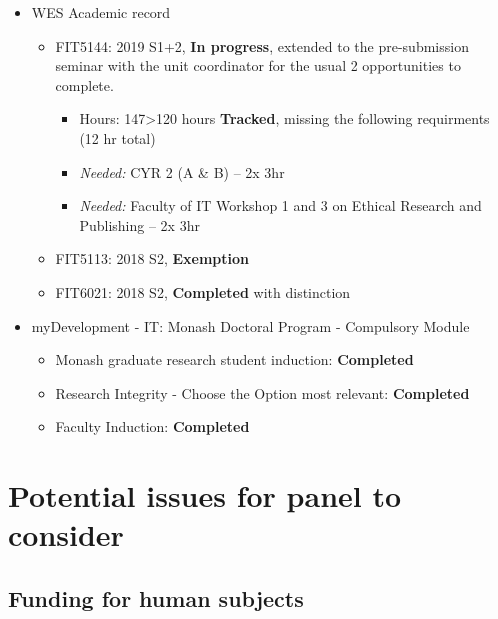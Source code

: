 \documentclass[
  11,
]{article}
\providecommand{\tightlist}{%
  \setlength{\itemsep}{0pt}\setlength{\parskip}{0pt}}
\begin{document}
\begin{itemize}
\tightlist
\item
  WES Academic record

  \begin{itemize}
  \tightlist
  \item
    FIT5144: 2019 S1+2, \textbf{In progress}, extended to the pre-submission seminar with the unit coordinator for the usual 2 opportunities to complete.

    \begin{itemize}
    \tightlist
    \item
      Hours: 147\textgreater120 hours \textbf{Tracked}, missing the following requirments (12 hr total)
    \item
      \emph{Needed:} CYR 2 (A \& B) -- 2x 3hr
    \item
      \emph{Needed:} Faculty of IT Workshop 1 and 3 on Ethical Research and Publishing -- 2x 3hr
    \end{itemize}
  \item
    FIT5113: 2018 S2, \textbf{Exemption}
  \item
    FIT6021: 2018 S2, \textbf{Completed} with distinction
  \end{itemize}
\item
  myDevelopment - IT: Monash Doctoral Program - Compulsory Module

  \begin{itemize}
  \tightlist
  \item
    Monash graduate research student induction: \textbf{Completed}
  \item
    Research Integrity - Choose the Option most relevant: \textbf{Completed}
  \item
    Faculty Induction: \textbf{Completed}
  \end{itemize}
\end{itemize}

\hypertarget{potential-issues-for-panel-to-consider}{%
\section{Potential issues for panel to consider}\label{potential-issues-for-panel-to-consider}}

\hypertarget{funding-for-human-subjects}{%
\subsection{Funding for human subjects}\label{funding-for-human-subjects}}
\end{document}
